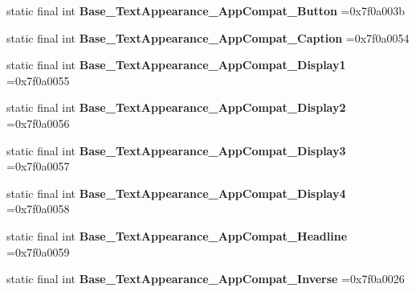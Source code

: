 \begin{DoxyCompactItemize}
\item 
\mbox{\label{classproject4_1_1xaria_1_1R_1_1style_a1946d672529b5d5c0cbcff3d675376f7}} 
static final int {\bfseries Base\+\_\+\+Text\+Appearance\+\_\+\+App\+Compat\+\_\+\+Button} =0x7f0a003b
\item 
\mbox{\label{classproject4_1_1xaria_1_1R_1_1style_a3ca890d7e0dcb81af832528e96f7ab7c}} 
static final int {\bfseries Base\+\_\+\+Text\+Appearance\+\_\+\+App\+Compat\+\_\+\+Caption} =0x7f0a0054
\item 
\mbox{\label{classproject4_1_1xaria_1_1R_1_1style_ac051c47f05ab5286c51444dff82983be}} 
static final int {\bfseries Base\+\_\+\+Text\+Appearance\+\_\+\+App\+Compat\+\_\+\+Display1} =0x7f0a0055
\item 
\mbox{\label{classproject4_1_1xaria_1_1R_1_1style_aa6001636955691a2471a52ccc531d73e}} 
static final int {\bfseries Base\+\_\+\+Text\+Appearance\+\_\+\+App\+Compat\+\_\+\+Display2} =0x7f0a0056
\item 
\mbox{\label{classproject4_1_1xaria_1_1R_1_1style_a1e850ac8faf52a30674aeff33f6ca0e0}} 
static final int {\bfseries Base\+\_\+\+Text\+Appearance\+\_\+\+App\+Compat\+\_\+\+Display3} =0x7f0a0057
\item 
\mbox{\label{classproject4_1_1xaria_1_1R_1_1style_a6197356c6145edb80e64f8a4dc0a878c}} 
static final int {\bfseries Base\+\_\+\+Text\+Appearance\+\_\+\+App\+Compat\+\_\+\+Display4} =0x7f0a0058
\item 
\mbox{\label{classproject4_1_1xaria_1_1R_1_1style_abefa4eaf9476aa0a2fdd75082ae3dd04}} 
static final int {\bfseries Base\+\_\+\+Text\+Appearance\+\_\+\+App\+Compat\+\_\+\+Headline} =0x7f0a0059
\item 
\mbox{\label{classproject4_1_1xaria_1_1R_1_1style_ac47fdc600d68008eff757af939b194fa}} 
static final int {\bfseries Base\+\_\+\+Text\+Appearance\+\_\+\+App\+Compat\+\_\+\+Inverse} =0x7f0a0026
\item 

\end{DoxyCompactItemize}
